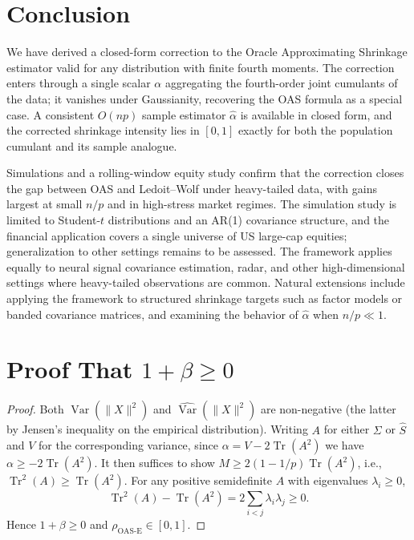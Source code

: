 \documentclass[journal]{IEEEtran}
\begin{document}
\section{Conclusion}\label{sec-conclusion}

We have derived a closed-form correction to the Oracle Approximating Shrinkage estimator
valid for any distribution with finite fourth moments.
The correction enters through a single scalar $\alpha$ aggregating the fourth-order joint
cumulants of the data; it vanishes under Gaussianity, recovering the OAS formula
as a special case.
A consistent $O(np)$ sample estimator $\hat{\alpha}$ is available in closed form, and the
corrected shrinkage intensity lies in $[0,1]$ exactly for both the population cumulant and
its sample analogue.

Simulations and a rolling-window equity study confirm that the correction closes the gap
between OAS and Ledoit--Wolf under heavy-tailed data, with gains largest at small
$n/p$ and in high-stress market regimes.
The simulation study is limited to Student-$t$ distributions and an AR(1) covariance
structure, and the financial application covers a single universe of US large-cap equities;
generalization to other settings remains to be assessed.
The framework applies equally to neural signal covariance estimation, radar, and other
high-dimensional settings where heavy-tailed observations are common.
Natural extensions include applying the framework to structured shrinkage targets such as
factor models or banded covariance matrices, and examining the behavior of $\hat{\alpha}$
when $n/p\ll1$.

\appendix
\section{Proof That $1+\beta\geq 0$}
\label{app:proof}

\begin{proof}
Both $\operatorname{Var}(\lVert X\rVert^2)$ and $\widehat{\operatorname{Var}}(\lVert X\rVert^2)$
are non-negative (the latter by Jensen's inequality on the empirical distribution).
Writing $A$ for either $\Sigma$ or $\hat{S}$ and $V$ for the corresponding variance,
since $\alpha=V-2\operatorname{Tr}(A^2)$ we have $\alpha\geq-2\operatorname{Tr}(A^2)$.
It then suffices to show $M\geq2(1-1/p)\operatorname{Tr}(A^2)$, i.e.,
$\operatorname{Tr}^2(A)\geq\operatorname{Tr}(A^2)$.
For any positive semidefinite $A$ with eigenvalues $\lambda_i\geq0$,
\[
\operatorname{Tr}^2(A)-\operatorname{Tr}(A^2) = 2\sum_{i<j}\lambda_i\lambda_j \geq 0.
\]
Hence $1+\beta\geq0$ and $\rho_{\text{OAS-E}}\in[0,1]$.
\end{proof}
\end{document}
